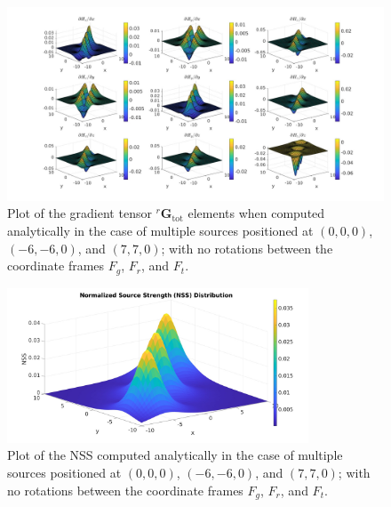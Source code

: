 \documentclass[main]{subfiles}
\begin{document}
\begin{figure}
\hspace*{-0.2\textwidth}
\includegraphics[width=1.4\textwidth]{images/gradients_multi_anal.jpg}
\caption{Plot of the gradient tensor ${}^r \mathbf{G}_{\text{tot}}$ elements
when computed analytically in the case of multiple sources positioned at  $(0,0,0)$, $(-6,-6,0)$, and $(7,7,0)$; with no rotations 
between the coordinate frames \( F_g \), \( F_r \), and \( F_t \).}
\label{fig:gradients_multi_anal}
\end{figure}

\begin{figure}
\centering
\includegraphics[width=0.8\textwidth]{images/NSS_multi_anal.jpg}
\caption{Plot of the NSS computed analytically in the case of multiple sources positioned at  $(0,0,0)$, $(-6,-6,0)$, and $(7,7,0)$; with no rotations 
between the coordinate frames \( F_g \), \( F_r \), and \( F_t \).}
\label{fig:NSS_multi_anal}
\end{figure}
\end{document}

